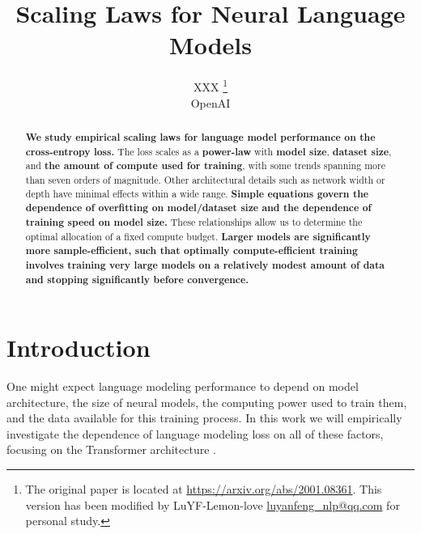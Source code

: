 \documentclass[english]{article}
\title{Scaling Laws for Neural Language Models}
\author{
    XXX \thanks{The original paper is located at \url{https://arxiv.org/abs/2001.08361}. This version has been modified by LuYF-Lemon-love \url{luyanfeng_nlp@qq.com} for personal study.}\\
    OpenAI
}
\begin{document}
\maketitle

\begin{abstract}
\textbf{We study empirical scaling laws for language model performance on the cross-entropy loss.}
The loss scales as a \textbf{power-law} with \textbf{model size}, \textbf{dataset size}, and \textbf{the amount of compute used for training}, with some trends spanning more than seven orders of magnitude.
Other architectural details such as network width or depth have minimal effects within a wide range.
\textbf{Simple equations govern the dependence of overfitting on model/dataset size and the dependence of training speed on model size.}
These relationships allow us to determine the optimal allocation of a fixed compute budget.
\textbf{Larger models are significantly more sample-efficient, such that optimally compute-efficient training involves training very large models on a relatively modest amount of data and stopping significantly before convergence.}

\end{abstract}

\tableofcontents{}

\section{Introduction}

One might expect language modeling performance to depend on model architecture, the size of neural models, the computing power used to train them, and the data available for this training process.  In this work we will empirically investigate the dependence of language modeling loss on all of these factors, focusing on the Transformer architecture \cite{OriginalTransformer,liu2018generating}.
\end{document}

